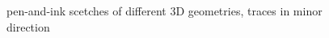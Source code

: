 \documentclass[a4paper,10pt,notitlepage]{scrreprt}
\begin{document}
\begin{figure}
 \caption{pen-and-ink scetches of different 3D geometries, traces in minor
direction}
 \label{fig:pen-and-ink}
\end{figure}
\end{document}
